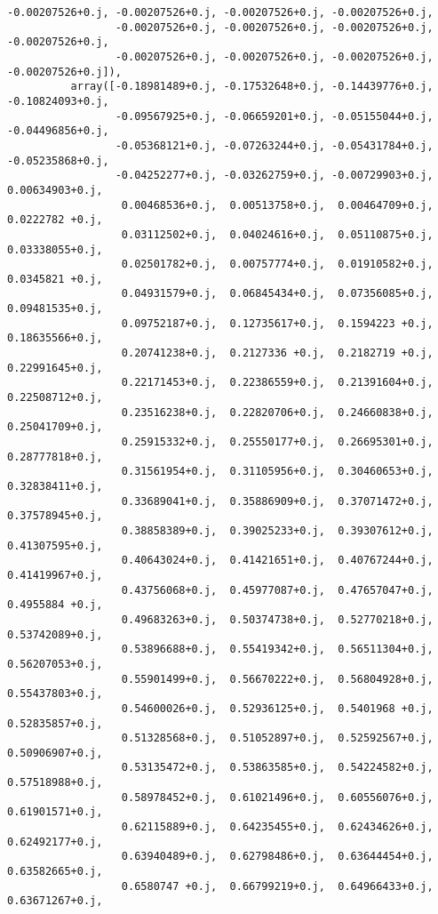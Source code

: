 \documentclass[11pt]{article}
\begin{document}
\begin{Verbatim}[commandchars=\\\{\}]
                 -0.00207526+0.j, -0.00207526+0.j, -0.00207526+0.j, -0.00207526+0.j,
                 -0.00207526+0.j, -0.00207526+0.j, -0.00207526+0.j, -0.00207526+0.j,
                 -0.00207526+0.j, -0.00207526+0.j, -0.00207526+0.j, -0.00207526+0.j]),
          array([-0.18981489+0.j, -0.17532648+0.j, -0.14439776+0.j, -0.10824093+0.j,
                 -0.09567925+0.j, -0.06659201+0.j, -0.05155044+0.j, -0.04496856+0.j,
                 -0.05368121+0.j, -0.07263244+0.j, -0.05431784+0.j, -0.05235868+0.j,
                 -0.04252277+0.j, -0.03262759+0.j, -0.00729903+0.j,  0.00634903+0.j,
                  0.00468536+0.j,  0.00513758+0.j,  0.00464709+0.j,  0.0222782 +0.j,
                  0.03112502+0.j,  0.04024616+0.j,  0.05110875+0.j,  0.03338055+0.j,
                  0.02501782+0.j,  0.00757774+0.j,  0.01910582+0.j,  0.0345821 +0.j,
                  0.04931579+0.j,  0.06845434+0.j,  0.07356085+0.j,  0.09481535+0.j,
                  0.09752187+0.j,  0.12735617+0.j,  0.1594223 +0.j,  0.18635566+0.j,
                  0.20741238+0.j,  0.2127336 +0.j,  0.2182719 +0.j,  0.22991645+0.j,
                  0.22171453+0.j,  0.22386559+0.j,  0.21391604+0.j,  0.22508712+0.j,
                  0.23516238+0.j,  0.22820706+0.j,  0.24660838+0.j,  0.25041709+0.j,
                  0.25915332+0.j,  0.25550177+0.j,  0.26695301+0.j,  0.28777818+0.j,
                  0.31561954+0.j,  0.31105956+0.j,  0.30460653+0.j,  0.32838411+0.j,
                  0.33689041+0.j,  0.35886909+0.j,  0.37071472+0.j,  0.37578945+0.j,
                  0.38858389+0.j,  0.39025233+0.j,  0.39307612+0.j,  0.41307595+0.j,
                  0.40643024+0.j,  0.41421651+0.j,  0.40767244+0.j,  0.41419967+0.j,
                  0.43756068+0.j,  0.45977087+0.j,  0.47657047+0.j,  0.4955884 +0.j,
                  0.49683263+0.j,  0.50374738+0.j,  0.52770218+0.j,  0.53742089+0.j,
                  0.53896688+0.j,  0.55419342+0.j,  0.56511304+0.j,  0.56207053+0.j,
                  0.55901499+0.j,  0.56670222+0.j,  0.56804928+0.j,  0.55437803+0.j,
                  0.54600026+0.j,  0.52936125+0.j,  0.5401968 +0.j,  0.52835857+0.j,
                  0.51328568+0.j,  0.51052897+0.j,  0.52592567+0.j,  0.50906907+0.j,
                  0.53135472+0.j,  0.53863585+0.j,  0.54224582+0.j,  0.57518988+0.j,
                  0.58978452+0.j,  0.61021496+0.j,  0.60556076+0.j,  0.61901571+0.j,
                  0.62115889+0.j,  0.64235455+0.j,  0.62434626+0.j,  0.62492177+0.j,
                  0.63940489+0.j,  0.62798486+0.j,  0.63644454+0.j,  0.63582665+0.j,
                  0.6580747 +0.j,  0.66799219+0.j,  0.64966433+0.j,  0.63671267+0.j,

\end{Verbatim}
\end{document}
